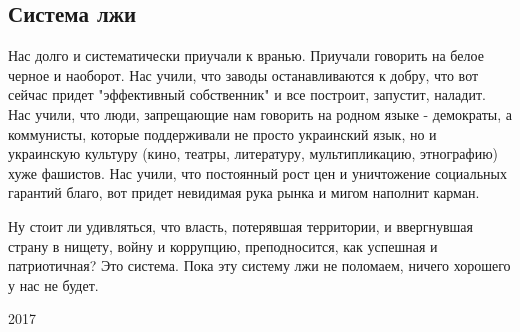  
 
 
 
 
\subsection{Система лжи}

Нас долго и систематически приучали к вранью. Приучали говорить на белое черное
и наоборот. Нас учили, что заводы останавливаются к добру, что вот сейчас
придет "эффективный собственник" и все построит, запустит, наладит. Нас учили,
что люди, запрещающие нам говорить на родном языке - демократы, а коммунисты,
которые поддерживали не просто украинский язык, но и украинскую культуру (кино,
театры, литературу, мультипликацию, этнографию) хуже фашистов. Нас учили, что
постоянный рост цен и уничтожение социальных гарантий благо, вот придет
невидимая рука рынка и мигом наполнит карман. 

Ну стоит ли удивляться, что власть, потерявшая территории, и ввергнувшая страну
в нищету, войну и коррупцию, преподносится, как успешная и патриотичная? Это
система. Пока эту систему лжи не поломаем, ничего хорошего у нас не будет.

2017
